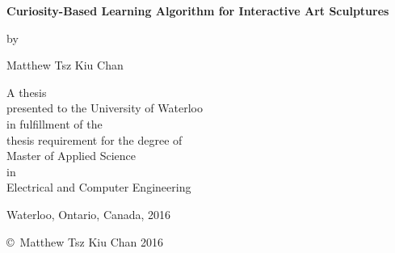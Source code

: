 \pagestyle{empty}

\begin{titlepage}
        \begin{center}
        \vspace*{1.0cm}

        \Huge
        {\bf Curiosity-Based Learning Algorithm for Interactive Art Sculptures}

        \vspace*{1.0cm}

        \normalsize
        by \\

        \vspace*{1.0cm}

        \Large
        Matthew Tsz Kiu Chan \\

        \vspace*{3.0cm}

        \normalsize
        A thesis \\
        presented to the University of Waterloo \\ 
        in fulfillment of the \\
        thesis requirement for the degree of \\
        Master of Applied Science \\
        in \\
        Electrical and Computer Engineering \\

        \vspace*{2.0cm}

        Waterloo, Ontario, Canada, 2016 \\

        \vspace*{1.0cm}

        \copyright\ Matthew Tsz Kiu Chan 2016 \\
        \end{center}
\end{titlepage}

\pagestyle{plain}
\setcounter{page}{2}

